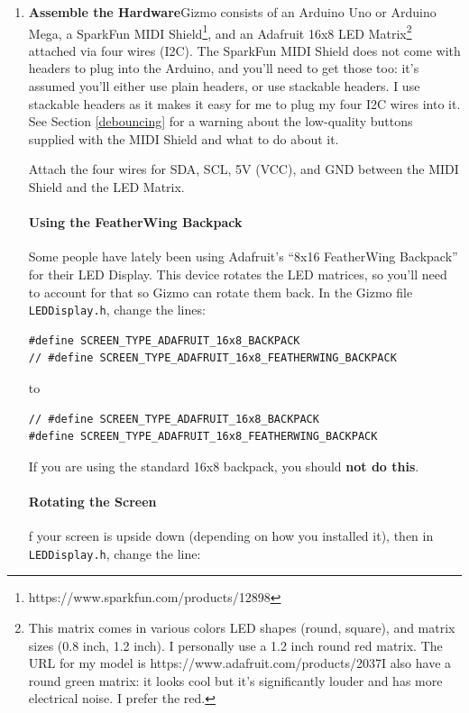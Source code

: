 \documentclass{article}
\begin{document}
\begin{enumerate}

\item {\bf Assemble the Hardware}\quad Gizmo consists of an Arduino Uno or Arduino Mega, a SparkFun MIDI Shield\footnote{https:/\!/www.sparkfun.com/products/12898}, and an Adafruit 16x8 LED Matrix\footnote{This matrix comes in various colors LED shapes (round, square), and matrix sizes (0.8 inch, 1.2 inch).  I personally use a 1.2 inch round red matrix.  The URL for my model is https:/\!/www.adafruit.com/products/2037\quad I also have a round green matrix: it looks cool but it's significantly louder and has more electrical noise.  I prefer the red.} attached via four wires (I2C).  The SparkFun MIDI Shield does not come with headers to plug into the Arduino, and you'll need to get those too: it's assumed you'll either use plain headers, or use stackable headers.  I use stackable headers as it makes it easy for me to plug my four I2C wires into it.  See Section \ref{debouncing} for a warning about the low-quality buttons supplied with the MIDI Shield and what to do about it.

Attach the four wires for SDA, SCL, 5V (VCC), and GND between the MIDI Shield and the LED Matrix.  

\paragraph{Using the FeatherWing Backpack} Some people have lately been using Adafruit's ``8x16 FeatherWing Backpack'' for their LED Display.  This device rotates the LED matrices, so you'll need to account for that so Gizmo can rotate them back.  In the Gizmo file \texttt{LEDDisplay.h}, change the lines:

\begin{verbatim}
#define SCREEN_TYPE_ADAFRUIT_16x8_BACKPACK
// #define SCREEN_TYPE_ADAFRUIT_16x8_FEATHERWING_BACKPACK
\end{verbatim}

to

\begin{verbatim}
// #define SCREEN_TYPE_ADAFRUIT_16x8_BACKPACK
#define SCREEN_TYPE_ADAFRUIT_16x8_FEATHERWING_BACKPACK
\end{verbatim}

If you are using the standard 16x8 backpack, you should {\bf not do this}.

\paragraph{Rotating the Screen} f your screen is upside down (depending on how you installed it), then in \texttt{LEDDisplay.h}, change the line:


\end{enumerate}
\end{document}
